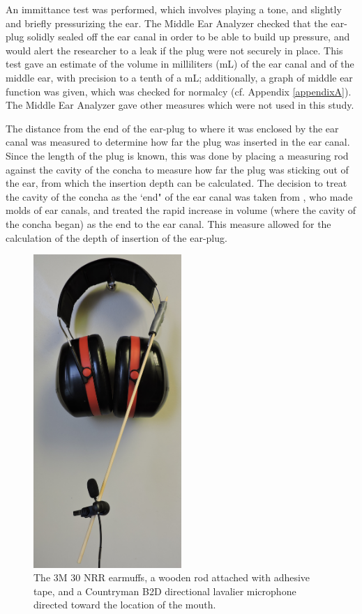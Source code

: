 An immittance test was performed, which involves playing a tone, and slightly and briefly pressurizing the ear.  The Middle Ear Analyzer checked that the ear-plug solidly sealed off the ear canal in order to be able to build up pressure, and would alert the researcher to a leak if the plug were not securely in place.  This test gave an estimate of the volume in milliliters (mL) of the ear canal and of the middle ear, with precision to a tenth of a mL; additionally, a graph of middle ear function was given, which was checked for normalcy (cf. Appendix \ref{appendixA}).  The Middle Ear Analyzer gave other measures which were not used in this study.

The distance from the end of the ear-plug to where it was enclosed by the ear canal was measured to determine how far the plug was inserted in the ear canal.
Since the length of the plug is known, this was done by placing a measuring rod against the cavity of the concha to measure how far the plug was sticking out of the ear, from which the insertion depth can be calculated. The decision to treat the cavity of the concha as the `end" of the ear canal was taken from \cite{stenfelt:07}, who made molds of ear canals, and treated the rapid increase in volume (where the cavity of the concha began) as the end to the ear canal.  This measure allowed for the calculation of the depth of insertion of the ear-plug.

\begin{figure}
\includegraphics[width=0.5\textwidth]{figure/earmuffSetup.JPG}
\caption{The 3M 30 NRR earmuffs, a wooden rod attached with adhesive tape, and a Countryman B2D directional lavalier microphone directed toward the location of the mouth.}
\label{fig:micInsertPlug}
\end{figure}


